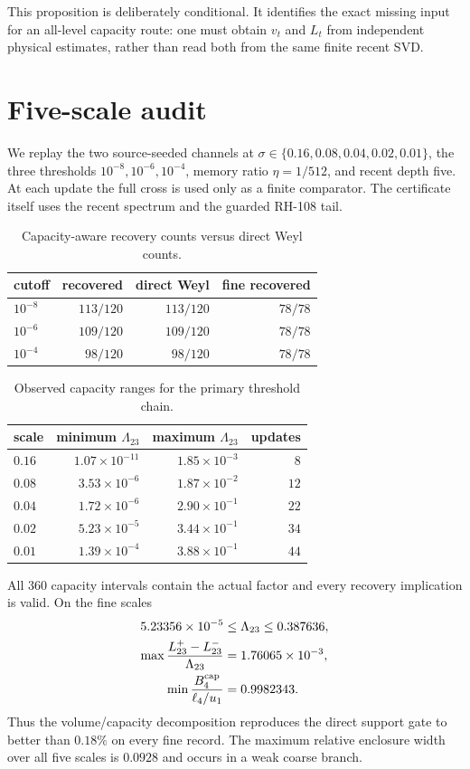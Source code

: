 \documentclass[11pt]{article}
\theoremstyle{remark}\newtheorem{remark}[theorem]{Remark}
\begin{document}
This proposition is deliberately conditional.  It identifies the exact
missing input for an all-level capacity route: one must obtain $v_t$ and
$L_t$ from independent physical estimates, rather than read both from the
same finite recent SVD.

\section{Five-scale audit}
We replay the two source-seeded channels at
$\sigma\in\{0.16,0.08,0.04,0.02,0.01\}$, the three thresholds
$10^{-8},10^{-6},10^{-4}$, memory ratio $\eta=1/512$, and recent depth five.
At each update the full cross is used only as a finite comparator.  The
certificate itself uses the recent spectrum and the guarded RH-108 tail.

\begin{table}[t]
\centering\small
\caption{Capacity-aware recovery counts versus direct Weyl counts.}
\begin{tabular}{@{}lrrr@{}}\toprule
cutoff & recovered & direct Weyl & fine recovered\\\midrule
$10^{-8}$ & $113/120$ & $113/120$ & $78/78$\\
$10^{-6}$ & $109/120$ & $109/120$ & $78/78$\\
$10^{-4}$ & $98/120$ & $98/120$ & $78/78$\\\bottomrule
\end{tabular}
\end{table}

\begin{table}[t]
\centering\small
\caption{Observed capacity ranges for the primary threshold chain.}
\begin{tabular}{@{}lrrr@{}}\toprule
scale & minimum $\Lambda_{23}$ & maximum $\Lambda_{23}$ & updates\\\midrule
$0.16$ & $1.07\times10^{-11}$ & $1.85\times10^{-3}$ & $8$\\
$0.08$ & $3.53\times10^{-6}$ & $1.87\times10^{-2}$ & $12$\\
$0.04$ & $1.72\times10^{-6}$ & $2.90\times10^{-1}$ & $22$\\
$0.02$ & $5.23\times10^{-5}$ & $3.44\times10^{-1}$ & $34$\\
$0.01$ & $1.39\times10^{-4}$ & $3.88\times10^{-1}$ & $44$\\\bottomrule
\end{tabular}
\end{table}

All 360 capacity intervals contain the actual factor and every recovery
implication is valid.  On the fine scales
\begin{align*}
 5.23356\times10^{-5}&\le\Lambda_{23}\le0.387636,\\
 \max\frac{L_{23}^+-L_{23}^-}{\Lambda_{23}}&=1.76065\times10^{-3},\\
 \min\frac{B_4^{\rm cap}}{\ell_4/u_1}&=0.9982343.
\end{align*}
Thus the volume/capacity decomposition reproduces the direct support gate to
better than $0.18\%$ on every fine record.  The maximum relative enclosure
width over all five scales is $0.0928$ and occurs in a weak coarse branch.
\end{document}

